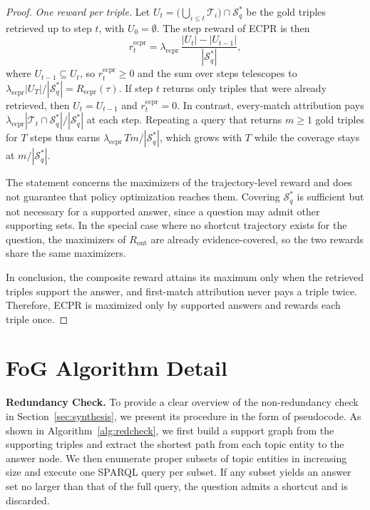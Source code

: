 \begin{proof}
\textit{One reward per triple.} Let $U_t=\bigl(\bigcup_{i\le t}\mathcal{T}_i\bigr)\cap\mathcal{S}^{*}_{q}$ be the gold triples retrieved up to step $t$, with $U_0=\emptyset$. The step reward of ECPR is then
\begin{equation}
    r^{\text{ecpr}}_{t}=\lambda_{\text{ecpr}}\,\frac{|U_t|-|U_{t-1}|}{|\mathcal{S}^{*}_{q}|},
\end{equation}
where $U_{t-1}\subseteq U_t$, so $r^{\text{ecpr}}_{t}\ge 0$ and the sum over steps telescopes to $\lambda_{\text{ecpr}}|U_T|/|\mathcal{S}^{*}_{q}|=R_{\text{ecpr}}(\tau)$. If step $t$ returns only triples that were already retrieved, then $U_t=U_{t-1}$ and $r^{\text{ecpr}}_{t}=0$. In contrast, every-match attribution pays $\lambda_{\text{ecpr}}|\mathcal{T}_t\cap\mathcal{S}^{*}_{q}|/|\mathcal{S}^{*}_{q}|$ at each step. Repeating a query that returns $m\ge 1$ gold triples for $T$ steps thus earns $\lambda_{\text{ecpr}}\,Tm/|\mathcal{S}^{*}_{q}|$, which grows with $T$ while the coverage stays at $m/|\mathcal{S}^{*}_{q}|$.

The statement concerns the maximizers of the trajectory-level reward and does not guarantee that policy optimization reaches them. Covering $\mathcal{S}^{*}_{q}$ is sufficient but not necessary for a supported answer, since a question may admit other supporting sets. In the special case where no shortcut trajectory exists for the question, the maximizers of $R_{\text{out}}$ are already evidence-covered, so the two rewards share the same maximizers.

In conclusion, the composite reward attains its maximum only when the retrieved triples support the answer, and first-match attribution never pays a triple twice. Therefore, ECPR is maximized only by supported answers and rewards each triple once.
\end{proof}

\section{FoG Algorithm Detail}
\label{app:redcheck}
\textbf{Redundancy Check.}
To provide a clear overview of the non-redundancy check in Section~\ref{sec:synthesis}, we present its procedure in the form of pseudocode. As shown in Algorithm~\ref{alg:redcheck}, we first build a support graph from the supporting triples and extract the shortest path from each topic entity to the answer node. We then enumerate proper subsets of topic entities in increasing size and execute one SPARQL query per subset. If any subset yields an answer set no larger than that of the full query, the question admits a shortcut and is discarded.

